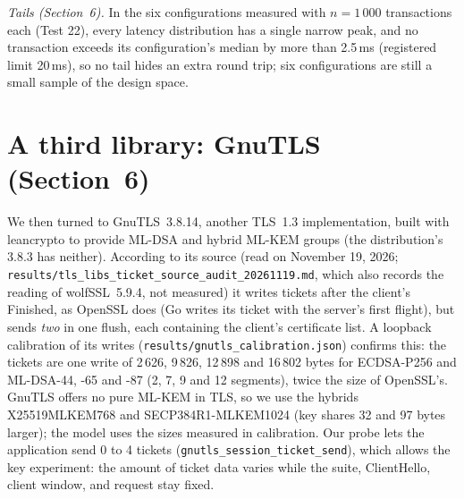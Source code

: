 \documentclass[9pt]{article}
\begin{document}
\emph{Tails (Section~6).} In the six configurations measured with $n=1\,000$ transactions each (Test 22), every latency distribution has a single narrow peak, and no transaction exceeds its configuration's median by more than 2.5\,ms (registered limit 20\,ms), so no tail hides an extra round trip; six configurations are still a small sample of the design space.

\section*{A third library: GnuTLS (Section~6)}
We then turned to GnuTLS~3.8.14, another TLS~1.3 implementation, built with leancrypto to provide ML-DSA and hybrid ML-KEM groups (the distribution's 3.8.3 has neither). According to its source (read on November 19, 2026; \texttt{results/tls\_libs\_ticket\_source\_audit\_20261119.md}, which also records the reading of wolfSSL~5.9.4, not measured) it writes tickets after the client's Finished, as OpenSSL does (Go writes its ticket with the server's first flight), but sends \emph{two} in one flush, each containing the client's certificate list. A loopback calibration of its writes (\texttt{results/gnutls\_calibration.json}) confirms this: the tickets are one write of 2\,626, 9\,826, 12\,898 and 16\,802 bytes for ECDSA-P256 and ML-DSA-44, -65 and -87 (2, 7, 9 and 12 segments), twice the size of OpenSSL's. GnuTLS offers no pure ML-KEM in TLS, so we use the hybrids X25519MLKEM768 and SECP384R1-MLKEM1024 (key shares 32 and 97 bytes larger); the model uses the sizes measured in calibration. Our probe lets the application send 0 to 4 tickets (\texttt{gnutls\_session\_ticket\_send}), which allows the key experiment: the amount of ticket data varies while the suite, ClientHello, client window, and request stay fixed.
\end{document}
